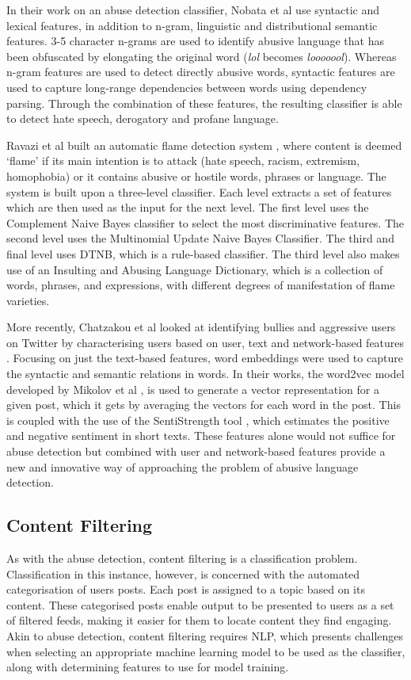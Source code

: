 In their work on an abuse detection classifier, Nobata et al \cite{nobata2016abusive} use syntactic and lexical features, in addition to n-gram, linguistic and distributional semantic features. 3-5 character n-grams are used to identify abusive language that has been obfuscated by elongating the original word (\textsl{lol} becomes \textsl{looooool}). Whereas n-gram features are used to detect directly abusive words, syntactic features are used to capture long-range dependencies between words using dependency parsing. Through the combination of these features, the resulting classifier is able to detect hate speech, derogatory and profane language.

Ravazi et al built an automatic flame detection system \cite{razavi2010offensive}, where content is deemed `flame' if its main intention is to attack (hate speech, racism, extremism, homophobia) or it contains abusive or hostile words, phrases or language. The system is built upon a three-level classifier. Each level extracts a set of features which are then used as the input for the next level. The first level uses the Complement Naive Bayes classifier to select the most discriminative features. The second level uses the Multinomial Update Naive Bayes Classifier. The third and final level uses DTNB, which is a rule-based classifier. The third level also makes use of an Insulting and Abusing Language Dictionary, which is a collection of words, phrases, and expressions, with different degrees of manifestation of flame varieties.

More recently, Chatzakou et al looked at identifying bullies and aggressive users on Twitter by characterising users based on user, text and network-based features \cite{chatzakou2017mean}. Focusing on just the text-based features, word embeddings were used to capture the syntactic and semantic relations in words. In their works, the word2vec model developed by Mikolov et al \cite{mikolov2013efficient}, is used to generate a vector representation for a given post, which it gets by averaging the vectors for each word in the post. This is coupled with the use of the SentiStrength tool \cite{SentiStrength:Home}, which estimates the positive and negative sentiment in short texts. These features alone would not suffice for abuse detection but combined with user and network-based features provide a new and innovative way of approaching the problem of abusive language detection.

\subsection{Content Filtering} \label{sec:research-content-filtering}
As with the abuse detection, content filtering is a classification problem. Classification in this instance, however, is concerned with the automated categorisation of users posts. Each post is assigned to a topic based on its content. These categorised posts enable output to be presented to users as a set of filtered feeds, making it easier for them to locate content they find engaging. Akin to abuse detection, content filtering requires NLP, which presents challenges when selecting an appropriate machine learning model to be used as the classifier, along with determining features to use for model training.

